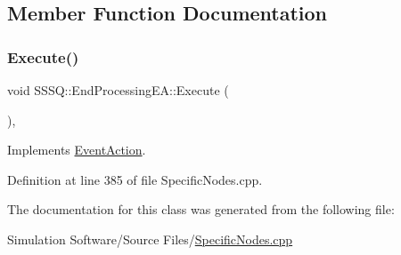 \subsection{Member Function Documentation}
\mbox{\label{class_s_s_s_q_1_1_end_processing_e_a_a58123dc9ac0660bd1da11407e5467968}} 
\subsubsection{\texorpdfstring{Execute()}{Execute()}}
{\footnotesize\ttfamily void S\+S\+S\+Q\+::\+End\+Processing\+E\+A\+::\+Execute (\begin{DoxyParamCaption}{ }\end{DoxyParamCaption})\hspace{0.3cm}{\ttfamily [inline]}, {\ttfamily [virtual]}}



Implements \hyperlink{class_event_action_a62b9d07abb4ca8e7c078b076a1ab1a9f}{Event\+Action}.



Definition at line 385 of file Specific\+Nodes.\+cpp.



The documentation for this class was generated from the following file\+:\begin{DoxyCompactItemize}
\item 
Simulation Software/\+Source Files/\hyperlink{_specific_nodes_8cpp}{Specific\+Nodes.\+cpp}\end{DoxyCompactItemize}
